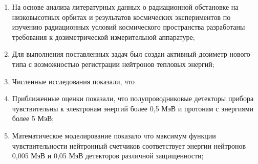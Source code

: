 \begin{enumerate}
  \item На основе анализа литературных данных о радиационной обстановке на низковысотных орбитах  и результатов космических экспериментов по изучению радиационных условий космического пространства разработаны требования к дозиметрической измерительной аппаратуре;
  \item Для выполнения поставленных задач был создан активный дозиметр нового типа с возможностью регистрации нейтронов тепловых энергий;
  \item Численные исследования показали, что 
  \item Приближенные оценки показали, что полупроводниковые детекторы прибора чувствительны к электронам энергий более 0,5 МэВ и протонам с энергиями более 5 МэВ;
  \item Математическое моделирование показало что максимум функции чувствительности нейтронный счетчиков соответствует энергии нейтронов 0,005 МэВ и 0,05 МэВ детекторов различной защищенности;
  
\end{enumerate}
